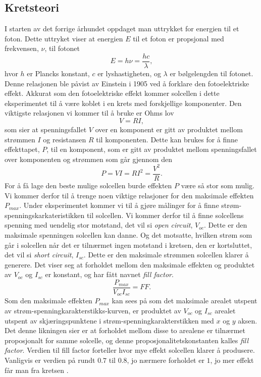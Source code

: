 \documentclass[%
 reprint,
 amsmath,amssymb,
 aps,
 norsk,
 booktabs
]{revtex4-1}
\begin{document}
\subsection{Kretsteori}
I starten av det forrige århundet oppdaget man uttrykket for energien til et foton. Dette uttryket viser at energien $E$ til et foton er propsjonal med frekvensen, $\nu$, til fotonet
\begin{equation}
  E = h\nu = \frac{hc}{\lambda} \label{einstein},
\end{equation}hvor $h$ er Plancks konstant, $c$ er lyshastigheten, og $\lambda$ er bølgelengden til fotonet. Denne relasjonen ble påvist av Einstein i 1905 ved å forklare den fotoelektriske effekt. Akkurat som den fotoelektriske effekt kommer solcellen i dette eksperimentet til å være koblet i en krets med forskjellige komponenter. Den viktigste relasjonen vi kommer til å bruke er Ohms lov
\begin{equation}
  V = RI, \label{ohm}
\end{equation}som sier at spenningsfallet $V$ over en komponent er gitt av produktet mellom strømmen $I$ og resistansen $R$ til komponenten. Dette kan brukes for å finne effekttapet, $P$, til en komponent, som er gitt av produktet mellom spenningsfallet over komponenten og strømmen som går gjennom den
\begin{equation}
  P = VI = RI^2 = \frac{V^2}{R} \label{effekt1}.
\end{equation}For å få lage den beste mulige solcellen burde effekten $P$ være så stor som mulig. Vi kommer derfor til å trenge noen viktige relasjoner for den maksimale effekten $P_{max}$. Under eksperimentet kommer vi til å gjøre målinger for å finne strøm-spenningskarkateristikken til solcellen. Vi kommer derfor til å finne solcellens spenning med uendelig stor motstand, det vil si \textit{open circuit}, $V_{oc}$. Dette er den maksimale spenningen solcellen kan danne. Og det motsatte, hvilken strøm som går i solcellen når det er tilnærmet ingen motstand i kretsen, den er kortsluttet, det vil si \textit{short circuit}, $I_{sc}$. Dette er den maksimale strømmen solcellen klarer å generere. Det viser seg at forholdet mellom den maksimale effekten og produktet av $V_{oc}$ og $I_{sc}$ er konstant, og har fått navnet \textit{fill factor}.
\begin{equation}
  \frac{P_{max}}{V_{oc}I_{sc}} = FF. \label{ff}
\end{equation}
Som den maksimale effekten $P_{max}$ kan sees på som det maksimale arealet utspent av strøm-spenningkarakterstikks-kurven, er produktet av $V_{oc}$ og $I_{sc}$ arealet utspent av skjæringspunktene i strøm-spenningkarakterstikken med $x$ og $y$ aksen. Det denne likningen sier er at forholdet mellom disse to arealene er tilnærmet proposjonalt for samme solcelle, og denne proposjonalitetskonstanten kalles \textit{fill factor}. Verdien til fill factor forteller hvor mye effekt solcellen klarer å produsere. Vanligvis er verdien på rundt $0.7$ til $0.8$, jo nærmere forholdet er $1$, jo mer effekt får man fra kretsen \cite{energy_alt}.\\
\end{document}
